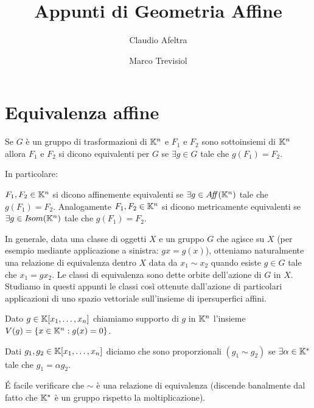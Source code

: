 \documentclass[a4paper,12pt]{article}
\title{Appunti di Geometria Affine}
\author{Claudio Afeltra \and Marco Trevisiol}
\begin{document}
\maketitle



\section{Equivalenza affine}

\begin{definition}
	Se $G$ è un gruppo di trasformazioni di $\mathbb K^n$ e $F_1$ e $F_2$ sono sottoinsiemi di $\mathbb K^n$ allora $F_1$ e $F_2$ si dicono equivalenti per 
	$G$ se $\exists g\in G$ tale che $g(F_1)=F_2$.
\end{definition}

In particolare:

\begin{definition}
	$F_1,F_2\in\mathbb K^n$ si dicono affinemente equivalenti se $\exists g \in A\!f\!\!f(\mathbb K^n)$ tale che $g(F_1) = F_2 .$
	Analogamente $F_1 , F_2 \in \mathbb K^n$ si dicono metricamente equivalenti se $\exists g \in I\!som(\mathbb K^n)$ tale che $g(F_1) = F_2 .$
\end{definition}
\begin{remark}
	In generale, data una classe di oggetti $X$ e un gruppo $G$ che agisce su $X$ (per esempio mediante applicazione a sinistra: $gx=g(x)$),
	otteniamo naturalmente una relazione di equivalenza dentro $X$ data da $x_1\sim x_2$ quando esiste $g\in G$ tale che $ x_1 = gx_2$.
	Le classi di equivalenza sono dette orbite dell'azione di $G$ in $X$. Studiamo in questi appunti le classi così ottenute dall'azione
	di particolari applicazioni di uno spazio vettoriale sull'insieme di ipersuperfici affini.
\end{remark}




\begin{definition}
	Dato $g\in \mathbb K[x_1,\dots,x_n]$ chiamiamo supporto di $g$ in $\mathbb K^n$ l'insieme $V(g)=\{x\in \mathbb K^n : g(x)=0\}$.
\end{definition}

\begin{definition}
	Dati $g_1,g_2\in \mathbb K[x_1,\dots,x_n]$ diciamo che sono proporzionali $(g_1\sim g_2)$ se $\exists \alpha \in \mathbb K^{*}$ tale che $g_1=\alpha g_2$.
\end{definition}
\begin{remark}
	\'E facile verificare che $\sim$ è una relazione di equivalenza
	(discende banalmente dal fatto che $\mathbb K^{*}$ è un gruppo rispetto la moltiplicazione).
\end{remark}
\end{document}
